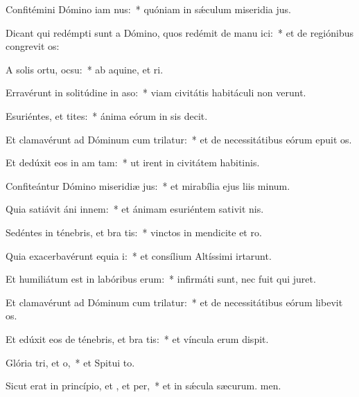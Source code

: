 \item Confitémini Dómino iam nus:~* quóniam in sǽculum miseridia jus.
\item Dicant qui redémpti sunt a Dómino, quos redémit de manu ici:~* et de regiónibus congrevit os:
\item A solis ortu,  ocsu:~* ab aquine, et ri.
\item Erravérunt in solitúdine in aso:~* viam civitátis habitáculi non verunt.
\item Esuriéntes, et tites:~* ánima eórum in sis decit.
\item Et clamavérunt ad Dóminum cum trilatur:~* et de necessitátibus eórum epuit os.
\item Et dedúxit eos in am tam:~* ut irent in civitátem habitinis.
\item Confiteántur Dómino miseridiæ jus:~* et mirabília ejus liis minum.
\item Quia satiávit áni innem:~* et ánimam esuriéntem sativit nis.
\item Sedéntes in ténebris, et bra tis:~* vinctos in mendicite et ro.
\item Quia exacerbavérunt equia i:~* et consílium Altíssimi irtarunt.
\item Et humiliátum est in labóribus  erum:~* infirmáti sunt, nec fuit qui juret.
\item Et clamavérunt ad Dóminum cum trilatur:~* et de necessitátibus eórum libevit os.
\item Et edúxit eos de ténebris, et bra tis:~* et víncula erum dispit.
\item Glória tri, et o,~* et Spitui to.
\item Sicut erat in princípio, et , et per,~* et in sǽcula sæcurum. men.
